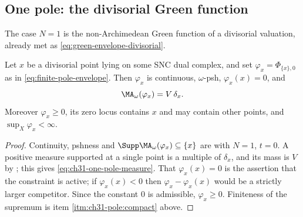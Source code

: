 \subsection{One pole: the divisorial Green function}
\label{sec:ch31-one-pole}

The case $N=1$ is the non-Archimedean Green function of a divisorial
valuation, already met as \eqref{eq:green-envelope-divisorial}.

\begin{proposition}
\label{prop:ch31-one-pole}
Let $x$ be a divisorial point lying on some SNC dual complex, and set
$\varphi_x=\Phi_{\{x\},0}$ as in \eqref{eq:finite-pole-envelope}.  Then
$\varphi_x$ is continuous, $\omega$-psh, $\varphi_x(x)=0$, and
\begin{equation}
\label{eq:ch31-one-pole-measure}
 \MA_\omega(\varphi_x)=V\,\delta_x .
\end{equation}
Moreover $\varphi_x\geq0$, its zero locus contains $x$ and may contain
other points, and $\sup_X\varphi_x<\infty$.
\end{proposition}

\begin{proof}
Continuity, pshness and $\Supp\MA_\omega(\varphi_x)\subseteq\{x\}$ are
 with $N=1$, $t=0$.  A positive measure
supported at a single point is a multiple of $\delta_x$, and its mass is
$V$ by ; this gives
\eqref{eq:ch31-one-pole-measure}.  That $\varphi_x(x)=0$ is the assertion
that the constraint is active; if $\varphi_x(x)<0$ then
$\varphi_x-\varphi_x(x)$ would be a strictly larger competitor.  Since
the constant $0$ is admissible, $\varphi_x\geq0$.  Finiteness of the
supremum is item \cref{itm:ch31-pole:compact} above.
\end{proof}

